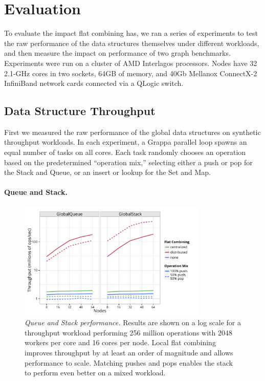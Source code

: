 \section{Evaluation}
To evaluate the impact flat combining has, we ran a series of experiments to test the raw performance of the data structures themselves under different workloads, and then measure the impact on performance of two graph benchmarks.
Experiments were run on a cluster of AMD Interlagos processors. Nodes have 32 2.1-GHz cores in two sockets, 64GB of memory, and 40Gb Mellanox ConnectX-2 InfiniBand network cards connected via a QLogic switch.

\subsection{Data Structure Throughput}
First we measured the raw performance of the global data structures on synthetic throughput workloads. In each experiment, a Grappa parallel loop spawns an equal number of tasks on all cores. Each task randomly chooses an operation based on the predetermined ``operation mix,'' selecting either a push or pop for the Stack and Queue, or an insert or lookup for the Set and Map.

\paragraph{Queue and Stack.}
\begin{figure}[t]
  \centering
  \includegraphics[width=0.8\textwidth]{data/plots/vector_perf.pdf}
  \caption{\emph{Queue and Stack performance.}
    Results are shown on a log scale for a throughput workload performing 256 million operations with 2048 workers per core and 16 cores per node. Local flat combining improves throughput by at least an order of magnitude and allows performance to scale. Matching pushes and pops enables the stack to perform even better on a mixed workload.
  }
  \label{fig:vector}
\end{figure}

